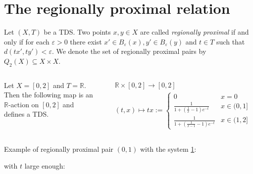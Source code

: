 \section{The regionally proximal relation}

\begin{frame}
  \begin{definition}
    \label{def:rpr}
    Let $(X, T)$ be a TDS.
    Two points $x,y \in X$ are called \emph{regionally proximal}
    if and only if for each $\varepsilon > 0$ there exist $x' \in B_\varepsilon(x), y' \in B_\varepsilon(y)$
    and $t \in T$ such that $d(tx', ty') < \varepsilon$.
    We denote the set of regionally proximal pairs by $Q_2(X) \subseteq X \times X$.
  \end{definition}
  \begin{center}
    
  \end{center}
\end{frame}

\begin{frame}
  \begin{columns}
  Let $X = [0, 2]$ and $T = \mathbb{R}$.
  Then the following map is an $\mathbb{R}$-action on $[0, 2]$
  and defines a TDS.

  \begin{align*}
    &\mathbb{R} \times [0, 2] \to [0, 2] \\
    &(t, x) \mapsto
    tx := \begin{cases}
      0 & x = 0 \\
      \frac{1}{1 + (\frac{1}{x} - 1)e^{-t}} & x \in (0, 1] \\
      \frac{1}{1 + (\frac{1}{x - 1} - 1)e^{-t}} & x \in (1, 2]
    \end{cases}
  \end{align*} 
  
  \end{columns} 
\end{frame}

\begin{frame}
  Example of regionally proximal pair $(0, 1)$ with the system \ref{}:
  
  with $t$ large enough:
    
\end{frame}